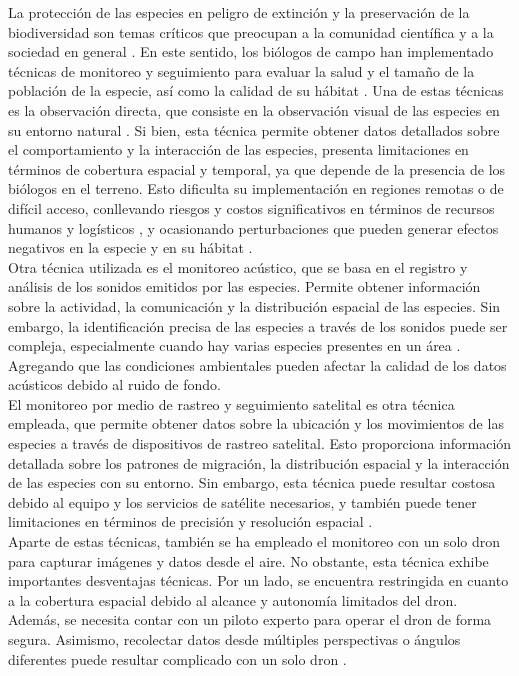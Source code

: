 La protección de las especies en peligro de extinción y la preservación de la biodiversidad son temas críticos que preocupan a la comunidad científica y a la sociedad en general \cite{15}. En este sentido, los biólogos de campo han implementado técnicas de monitoreo y seguimiento para evaluar la salud y el tamaño de la población de la especie, así como la calidad de su hábitat \cite{16}. Una de estas técnicas es la observación directa, que consiste en la observación visual de las especies en su entorno natural \cite{17}. Si bien, esta técnica permite obtener datos detallados sobre el comportamiento y la interacción de las especies, presenta limitaciones en términos de cobertura espacial y temporal, ya que depende de la presencia de los biólogos en el terreno. Esto dificulta su implementación en regiones remotas o de difícil acceso, conllevando riesgos y costos significativos en términos de recursos humanos y logísticos \cite{18}, y ocasionando perturbaciones que pueden generar efectos negativos en la especie y en su hábitat \cite{19}.\\
Otra técnica utilizada es el monitoreo acústico, que se basa en el registro y análisis de los sonidos emitidos por las especies. Permite obtener información sobre la actividad, la comunicación y la distribución espacial de las especies. Sin embargo, la identificación precisa de las especies a través de los sonidos puede ser compleja, especialmente cuando hay varias especies presentes en un área \cite{20}. Agregando que las condiciones ambientales pueden afectar la calidad de los datos acústicos debido al ruido de fondo.\\
El monitoreo por medio de rastreo y seguimiento satelital es otra técnica empleada, que permite obtener datos sobre la ubicación y los movimientos de las especies a través de dispositivos de rastreo satelital. Esto proporciona información detallada sobre los patrones de migración, la distribución espacial y la interacción de las especies con su entorno. Sin embargo, esta técnica puede resultar costosa debido al equipo y los servicios de satélite necesarios, y también puede tener limitaciones en términos de precisión y resolución espacial \cite{21}.\\
Aparte de estas técnicas, también se ha empleado el monitoreo con un solo dron para capturar imágenes y datos desde el aire. No obstante, esta técnica exhibe importantes desventajas técnicas. Por un lado, se encuentra restringida en cuanto a la cobertura espacial debido al alcance y autonomía limitados del dron. Además, se necesita contar con un piloto experto para operar el dron de forma segura. Asimismo, recolectar datos desde múltiples perspectivas o ángulos diferentes puede resultar complicado con un solo dron \cite{22}.\\
